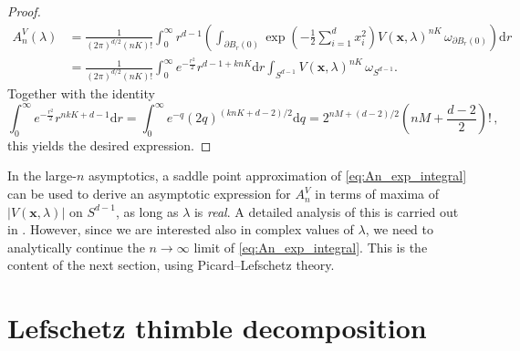 \documentclass[11pt, a4paper]{article}
\numberwithin{theorem}{section}
\theoremstyle{remark}
\renewcommand{\d}{\mathrm{d}}
\newcommand{\bb}[1]{\boldsymbol{#1}}
\theoremstyle{theorem}
\begin{document}
\begin{proof}
  \begin{align*}
    A^V_n(\lambda) & = \frac{1}{(2\pi)^{d/2} (nK)!} \int_{0}^{\infty} r^{d-1} \left( \int_{\partial B_r(0)} \exp\left( -\frac{1}{2} \sum_{i=1}^{d} x_i^2 \right) V(\bb{x},\lambda)^{nK} \,\omega_{\partial B_r(0)} \right) \d r\\
    & = \frac{1}{(2\pi)^{d/2} (nK)!} \int_{0}^{\infty} e^{-\frac{r^2}{2}} r^{d-1 + knK} \d r \int_{S^{d-1}} V(\bb{x},\lambda)^{nK} \,\omega_{S^{d-1}}.
  \end{align*}
  Together with the identity
  \[
    \int_{0}^{\infty} e^{-\frac{r^2}{2}} r^{nkK+d-1} \d r = \int_{0}^{\infty} e^{-q} (2q)^{(knK + d-2)/2} \d q = 2^{nM + (d-2)/2} \left(nM + \frac{d-2}{2}\right)!\,,
  \]
  this yields the desired expression.
\end{proof}

In the large-$n$ asymptotics, a saddle point approximation of \eqref{eq:An_exp_integral} can be used to derive an asymptotic expression for $A^V_n$ in terms of maxima of $|V(\bb{x},\lambda)|$ on $S^{d-1}$, as long as $\lambda$ is \emph{real}. A detailed analysis of this is carried out in \cite{multicolor}. However, since we are interested also in complex values of $\lambda$, we need to analytically continue the $n\rightarrow\infty$ limit of \eqref{eq:An_exp_integral}. This is the content of the next section, using Picard--Lefschetz theory.


\section{Lefschetz thimble decomposition}
\label{sec:Lefschetz}
\end{document}
